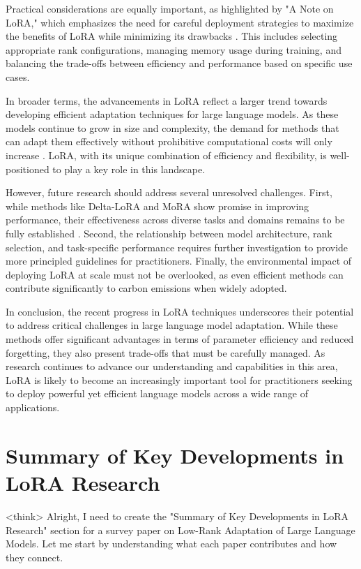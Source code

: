 \documentclass[conference]{IEEEtran}
\begin{document}
Practical considerations are equally important, as highlighted by "A Note on LoRA," which emphasizes the need for careful deployment strategies to maximize the benefits of LoRA while minimizing its drawbacks \cite{bX}. This includes selecting appropriate rank configurations, managing memory usage during training, and balancing the trade-offs between efficiency and performance based on specific use cases.

In broader terms, the advancements in LoRA reflect a larger trend towards developing efficient adaptation techniques for large language models. As these models continue to grow in size and complexity, the demand for methods that can adapt them effectively without prohibitive computational costs will only increase \cite{bX}. LoRA, with its unique combination of efficiency and flexibility, is well-positioned to play a key role in this landscape.

However, future research should address several unresolved challenges. First, while methods like Delta-LoRA and MoRA show promise in improving performance, their effectiveness across diverse tasks and domains remains to be fully established \cite{bX}. Second, the relationship between model architecture, rank selection, and task-specific performance requires further investigation to provide more principled guidelines for practitioners. Finally, the environmental impact of deploying LoRA at scale must not be overlooked, as even efficient methods can contribute significantly to carbon emissions when widely adopted.

In conclusion, the recent progress in LoRA techniques underscores their potential to address critical challenges in large language model adaptation. While these methods offer significant advantages in terms of parameter efficiency and reduced forgetting, they also present trade-offs that must be carefully managed. As research continues to advance our understanding and capabilities in this area, LoRA is likely to become an increasingly important tool for practitioners seeking to deploy powerful yet efficient language models across a wide range of applications.

\section{Summary of Key Developments in LoRA Research}
<think>
Alright, I need to create the "Summary of Key Developments in LoRA Research" section for a survey paper on Low-Rank Adaptation of Large Language Models. Let me start by understanding what each paper contributes and how they connect.
\end{document}
